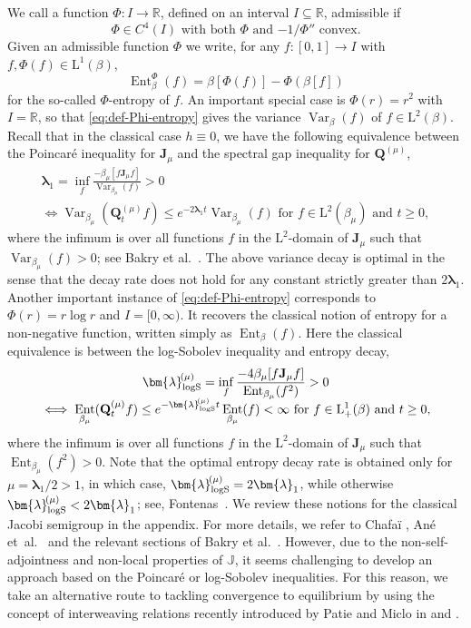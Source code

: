 \documentclass[JEP,XML,SOM,Unicode]{cedram}
\theoremstyle{plain}
\theoremstyle{definition}
\DeclareMathOperator{\Var}{Var}
\DeclareMathOperator{\Ent}{Ent}
\newcommand{\R}{\mathbb{R}}
\newcommand{\calJ}{\mathds{J}}
\newcommand{\Leb}{\mathrm{L}}
\newcommand{\calJd}{\mathbf{J}}
\newcommand{\lam}{{\bm{\lambda}_1}}
\newcommand{\logSob}[1][\mo]{\bm{\lambda}_{\mathrm{logS}}^{\hspace{-0.06cm}(#1)}}
\newcommand{\Q}[1][\mo]{\mathbf{Q}^{({#1})}}
\newcommand{\gab}[1][\lam,\mo]{{\beta_{#1}}}
\let\mo\mu
\let\bpsi\beta
\begin{document}
We call a function $\Phi:I \to \R$, defined on an interval $I \subseteq \R$, admissible if
\begin{equation}
\label{eq:def-admissible}
\text{$\Phi \in C^4(I)$ with both $\Phi$ and $-1/\Phi''$ convex.}
\end{equation}
Given an admissible function $\Phi$ we write, for any $f:[0,1] \to I$ with $f, \Phi(f) \in \Leb^1(\bpsi)$,
\begin{equation}
\label{eq:def-Phi-entropy}
\Ent_\bpsi^\Phi(f) = \bpsi[\Phi(f)] - \Phi(\bpsi [f])
\end{equation}
for the so-called $\Phi$-entropy of $f$. An important special case is $\Phi(r) = r^2$ with $I = \R$, so that \eqref{eq:def-Phi-entropy} gives the variance $\Var_\bpsi(f)$ of $f \in \Leb^2(\bpsi)$. Recall that in the classical case $h \equiv 0$, we have the following equivalence between the Poincaré inequality for $\calJd_\mo$ and the spectral gap inequality for $\Q$,
\begin{multline*}
\lam = \inf_f \frac{-\gab[\mo][f \calJd_\mo f]}{\Var_{\gab[\mo]}(f)} > 0\\[-5pt]
\iff \Var_{\gab[\mo]}(\Q_t f ) \leq e^{-2\lam t} \Var_{\gab[\mo]}(f) \text{ for } f \in \Leb^2(\gab[\mo]) \text{ and } t \geq 0,
\end{multline*}
where the infimum is over all functions $f$ in the $\Leb^2$-domain of $\calJd_\mo$ such that
\hbox{$\Var_{\gab[\mo]}(f) > 0$}; see \eg Bakry et al.~\cite[Chap.\,4.2]{Bakry_Book}. The above variance decay is optimal in the sense that the decay rate does not hold for any constant strictly greater than $2\lam$. Another important instance of \eqref{eq:def-Phi-entropy} corresponds to $\Phi(r)=r\log r$ and $I = [0, \infty)$. It recovers the classical notion of entropy for a non-negative function, written simply as $\Ent_\bpsi(f)$. Here the classical equivalence is between the log-Sobolev inequality and entropy decay,
\begin{multline*}
\logSob[\mo] = \inf_f \frac{-4\gab[\mo] [f \calJd_\mo f]}{\Ent_{\gab[\mo]} (f^2)} > 0\\[-5pt]
\iff \Ent_{\gab[\mo]} (\Q[\mo]_tf) \leq e^{-\logSob[\mo] t} \Ent_{\gab[\mo]} (f) < \infty \text{ for } f \in \Leb^1_+(\bpsi) \text{ and } t \geq 0,
\end{multline*}
where the infimum is over all functions $f$ in the $\Leb^2$-domain of $\calJd_\mo$ such that \hbox{$\Ent_{\gab[\mo]} (f^2) > 0$}.
Note that the optimal entropy decay rate is obtained only for $\mo = \lam/2 > 1$, in which case, $\logSob[\mo] = 2\lam$, while otherwise $\logSob[\mo] < 2\lam$; see, \eg Fontenas~\cite{fontenas:1998}. We review these notions for the classical Jacobi semigroup in the appendix. For more details, we refer to Chafaï \cite{chafai}, Ané et~al.~\cite{logSobolev-book} and the relevant sections of Bakry et al.~\cite{Bakry_Book}. However, due to the non-self-adjointness and non-local properties of $\calJ$, it seems challenging to develop an approach based on the Poincaré or log-Sobolev inequalities. For this reason, we take an alternative route to tackling convergence to equilibrium by using the concept of interweaving relations recently introduced by Patie and Miclo in \cite[\S 3.5]{Gateway} and \cite{Patie-Miclo}.
\end{document}
